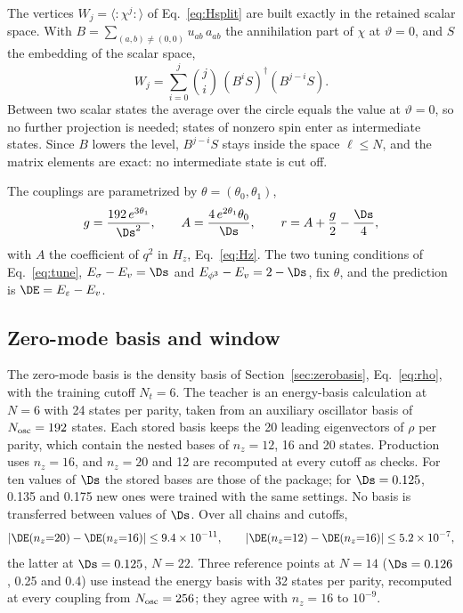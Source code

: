 The vertices $W_j=\langle{:}\chi^j{:}\rangle$ of Eq.~\eqref{eq:Hsplit} are built exactly in the retained scalar space.
With $B=\sum_{(a,b)\neq(0,0)}u_{ab}\,a_{ab}$ the annihilation part of $\chi$ at $\vartheta=0$, and $S$ the embedding of
the scalar space,
\begin{equation}
 W_j=\sum_{i=0}^{j}\binom ji\,(B^iS)^\dagger(B^{j-i}S).
 \label{d2:eq:W}
\end{equation}
Between two scalar states the average over the circle equals the value at $\vartheta=0$, so no further projection is
needed; states of nonzero spin enter as intermediate states. Since $B$ lowers the level, $B^{j-i}S$ stays inside the
space $\ell\le N$, and the matrix elements are exact: no intermediate state is cut off.

The couplings are parametrized by $\theta=(\theta_0,\theta_1)$,
\begin{equation}
 g=\frac{192\,e^{3\theta_1}}{\Ds^2},\qquad A=\frac{4\,e^{2\theta_1}\theta_0}{\Ds},\qquad
 r=A+\frac g2-\frac{\Ds}4 ,
 \label{d2:eq:theta}
\end{equation}
with $A$ the coefficient of $q^2$ in $H_z$, Eq.~\eqref{eq:Hz}. The two tuning conditions of Eq.~\eqref{eq:tune},
$E_\sigma-E_v=\Ds$ and $E_{\phi^3}-E_v=2-\Ds$, fix $\theta$, and the prediction is $\DE=E_\varepsilon-E_v$.

\subsection{Zero-mode basis and window}\label{d2:basis}
The zero-mode basis is the density basis of Section~\ref{sec:zerobasis}, Eq.~\eqref{eq:rho}, with the training cutoff
$N_t=6$. The teacher is an energy-basis calculation at $N=6$ with 24 states per parity, taken from an auxiliary
oscillator basis of $N_{\rm osc}=192$ states. Each stored basis keeps the 20 leading eigenvectors of $\rho$ per parity,
which contain the nested bases of $n_z=12$, 16 and 20 states. Production uses $n_z=16$, and $n_z=20$ and 12 are
recomputed at every cutoff as checks. For ten values of $\Ds$ the stored bases are those of the package; for
$\Ds=0.125$, 0.135 and 0.175 new ones were trained with the same settings. No basis is transferred between values of
$\Ds$. Over all chains and cutoffs,
\begin{equation*}
 |\DE(n_z{=}20)-\DE(n_z{=}16)|\le9.4\times10^{-11},\qquad |\DE(n_z{=}12)-\DE(n_z{=}16)|\le5.2\times10^{-7},
\end{equation*}
the latter at $\Ds=0.125$, $N=22$. Three reference points at $N=14$ ($\Ds=0.126$, 0.25 and 0.4) use instead the energy
basis with 32 states per parity, recomputed at every coupling from $N_{\rm osc}=256$; they agree with $n_z=16$ to
$10^{-9}$.

